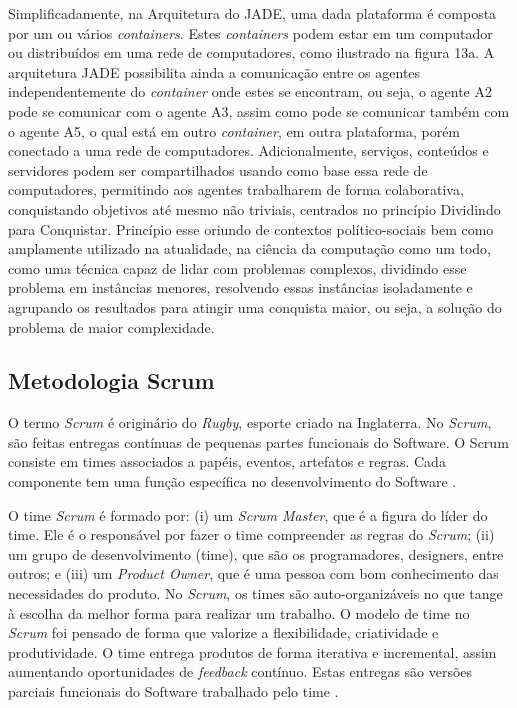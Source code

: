 Simplificadamente, na Arquitetura do JADE, uma dada plataforma é composta por um ou vários \textit{containers}. Estes \textit{containers} podem estar em um computador ou distribuídos em uma rede de computadores, como ilustrado na figura 13a. A arquitetura JADE possibilita ainda a comunicação entre os agentes independentemente do \textit{container} onde estes se encontram, ou seja, o agente A2 pode se comunicar com o agente A3, assim como pode se comunicar também com o agente A5, o qual está em outro \textit{container}, em outra plataforma, porém conectado a uma rede de computadores. Adicionalmente, serviços, conteúdos e servidores podem ser compartilhados usando como base essa rede de computadores, permitindo aos agentes trabalharem de forma colaborativa, conquistando objetivos até mesmo não triviais, centrados no princípio Dividindo para Conquistar. Princípio esse oriundo de contextos político-sociais bem como amplamente utilizado na atualidade, na ciência da computação como um todo, como uma técnica capaz de lidar com problemas complexos, dividindo esse problema em instâncias menores, resolvendo essas instâncias isoladamente e agrupando os resultados para atingir uma conquista maior, ou seja, a solução do problema de maior complexidade.


\subsection{Metodologia Scrum}

O termo \textit{Scrum} é originário do \textit{Rugby}, esporte criado na Inglaterra. No \textit{Scrum}, são feitas entregas contínuas de pequenas partes funcionais do Software. O Scrum consiste em times associados a papéis, eventos, artefatos e regras. Cada componente tem uma função específica no desenvolvimento do Software \cite{schwaber2013}.

O time \textit{Scrum} é formado por: (i) um \textit{Scrum Master}, que é a figura do líder do time. Ele é o responsável por fazer o time compreender as regras do \textit{Scrum}; (ii) um grupo de desenvolvimento (time), que são os programadores, designers, entre outros; e (iii) um \textit{Product Owner}, que é uma pessoa com bom conhecimento das necessidades do produto. No \textit{Scrum}, os times são auto-organizáveis no que tange à escolha da melhor forma para realizar um trabalho. O modelo de time no \textit{Scrum} foi pensado de forma que valorize a flexibilidade, criatividade e produtividade.  O time entrega produtos de forma iterativa e incremental, assim aumentando oportunidades de \textit{feedback} contínuo. Estas entregas são versões parciais funcionais do Software trabalhado pelo time \cite[p. 5-7]{schwaber2013}.

